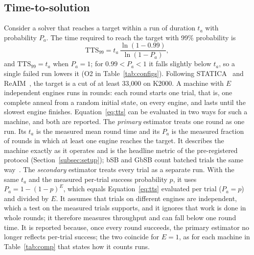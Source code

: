 \subsection{Time-to-solution}\label{subsec:tts}
Consider a solver that reaches a target within a run of duration $t_a$ with probability $P_a$. The time required to reach the target with 99\% probability is
\begin{equation}
\mathrm{TTS}_{99} = t_a\,\frac{\ln(1-0.99)}{\ln(1-P_a)} ,
\label{eq:tts}
\end{equation}
and $\mathrm{TTS}_{99}=t_a$ when $P_a=1$; for $0.99<P_a<1$ it falls slightly below $t_a$, so a single failed run lowers it (O2 in Table~\ref{tab:configs}). Following STATICA~\cite{yamamoto2021statica} and ReAIM~\cite{10609617}, the target is a cut of at least 33{,}000 on K2000. A machine with $E$ independent engines runs in rounds: each round starts one trial, that is, one complete anneal from a random initial state, on every engine, and lasts until the slowest engine finishes. Equation~\eqref{eq:tts} can be evaluated in two ways for such a machine, and both are reported. The \emph{primary} estimator treats one round as one run. Its $t_a$ is the measured mean round time and its $P_a$ is the measured fraction of rounds in which at least one engine reaches the target. It describes the machine exactly as it operates and is the headline metric of the pre-registered protocol (Section~\ref{subsec:setup}); bSB and GbSB count batched trials the same way~\cite{goto2021high,goto2026edge}. The \emph{secondary} estimator treats every trial as a separate run. With the same $t_a$ and the measured per-trial success probability $p$, it uses $P_a=1-(1-p)^E$, which equals Equation~\eqref{eq:tts} evaluated per trial ($P_a=p$) and divided by $E$. It assumes that trials on different engines are independent, which a test on the measured trials supports, and it ignores that work is done in whole rounds; it therefore measures throughput and can fall below one round time. It is reported because, once every round succeeds, the primary estimator no longer reflects per-trial success; the two coincide for $E=1$, as for each machine in Table~\ref{tab:comp} that states how it counts runs.
